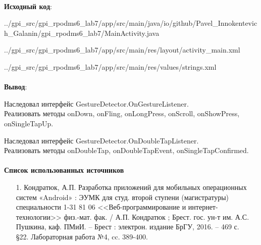 \documentclass[12pt, a4paper, simple]{eskdtext}
\begin{document}
    \paragraph{} \textbf{Исходный код}: 

    
        {../gpi_src/gpi_rpodms6_lab7/app/src/main/java/io/github/Pavel_Innokentevich_Galanin/gpi_rpodms6_lab7/MainActivity.java}

    
        {../gpi_src/gpi_rpodms6_lab7/app/src/main/res/layout/activity_main.xml}

    
        {../gpi_src/gpi_rpodms6_lab7/app/src/main/res/values/strings.xml}

    \paragraph{} \textbf{Вывод}:
    
    Наследовал интерфейс GestureDetector.OnGestureListener.\\
    Реализовать методы onDown, onFling, onLongPress, onScroll, onShowPress, onSingleTapUp.
    
    Наследовал интерфейс GestureDetector.OnDoubleTapListener.\\
    Реализовать методы onDoubleTap, onDoubleTapEvent, onSingleTapConfirmed.

    \paragraph{} \textbf{Список использованных источников} 
    \begin{enumerate}
        \item[1.] Кондратюк, А.П. Разработка приложений для мобильных операционных систем «Android» :
        ЭУМК для студ. второй ступени (магистратуры) специальности 1-31 81 06 <<Веб-программирование и интернет-технологии>>
        физ.-мат. фак. / А.П. Кондратюк ; Брест. гос. ун-т им. А.С. Пушкина, каф. ПМиИ. – Брест :
        электрон. издание БрГУ, 2016. – 469 с.\\
        §22. Лабораторная работа №4, cc. 389-400.
    \end{enumerate}
    \newpage
\end{document}
